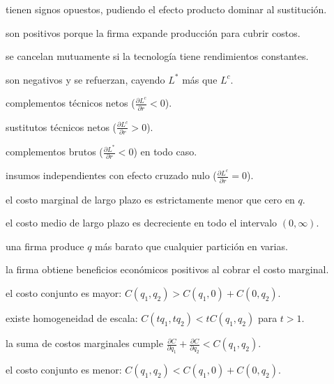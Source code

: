 \begin{opts}
    \item tienen signos opuestos, pudiendo el efecto producto dominar al sustitución.
    \item son positivos porque la firma expande producción para cubrir costos.
    \item se cancelan mutuamente si la tecnología tiene rendimientos constantes.
    \item son negativos y se refuerzan, cayendo $L^*$ más que $L^c$.
\end{opts}

\begin{opts}
    \item complementos técnicos netos ($\frac{\partial L^c}{\partial r} < 0$).
    \item sustitutos técnicos netos ($\frac{\partial L^c}{\partial r} > 0$).
    \item complementos brutos ($\frac{\partial L^*}{\partial r} < 0$) en todo caso.
    \item insumos independientes con efecto cruzado nulo ($\frac{\partial L^c}{\partial r} = 0$).
\end{opts}

\begin{opts}
    \item el costo marginal de largo plazo es estrictamente menor que cero en $q$.
    \item el costo medio de largo plazo es decreciente en todo el intervalo $(0, \infty)$.
    \item una firma produce $q$ más barato que cualquier partición en varias.
    \item la firma obtiene beneficios económicos positivos al cobrar el costo marginal.
\end{opts}

\begin{opts}
    \item el costo conjunto es mayor: $C(q_1, q_2) > C(q_1, 0) + C(0, q_2)$.
    \item existe homogeneidad de escala: $C(tq_1, tq_2) < t C(q_1, q_2)$ para $t > 1$.
    \item la suma de costos marginales cumple $\frac{\partial C}{\partial q_1} + \frac{\partial C}{\partial q_2} < C(q_1, q_2)$.
    \item el costo conjunto es menor: $C(q_1, q_2) < C(q_1, 0) + C(0, q_2)$.
\end{opts}

